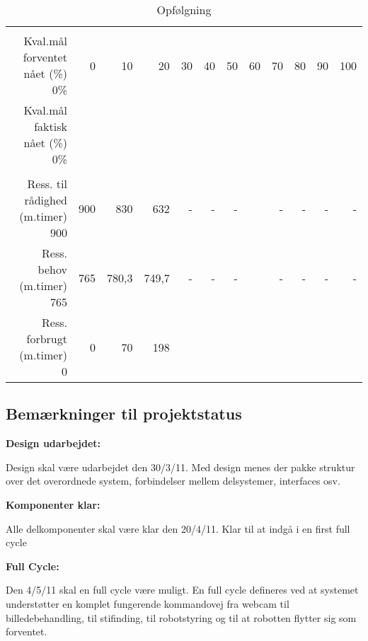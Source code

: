 \begin{sidewaystable}[!htbp]
\begin{scriptsize}
\begin{tabular}{r|rrrrrrr|rrrr}
          &       &       &       &       &       &       &       &       &       &       &  \\
    Kval.mål forventet nået (\%) 0\% & 0     & 10    & 20    & 30    & 40    & 50    & 60    & 70    & 80    & 90    & 100 \\
    Kval.mål faktisk nået (\%) 0\% &       &       &       &       &       &       &       &       &       &       &  \\
          &       &       &       &       &       &       &       &       &       &       &  \\
    Ress. til rådighed (m.timer) 900 & 900   & 830   & 632   & -     & -     & -     &       & -     & -     & -     & - \\
    Ress. behov (m.timer) 765 & 765   & 780,3 & 749,7 & -     & -     & -     &       & -     & -     & -     & - \\
    Ress. forbrugt (m.timer) 0 & 0     & 70    & 198   &       &       &       &       &       &       &       &  \\
    \end{tabular}%
\end{scriptsize}
\caption{Opfølgning}
\end{sidewaystable}


\subsection{Bemærkninger til projektstatus}
\textbf{Design udarbejdet:}

Design skal være udarbejdet den 30/3/11. 
Med design menes der pakke struktur over det overordnede system, forbindelser mellem delsystemer, interfaces osv.

\textbf{Komponenter klar:}

Alle delkomponenter skal være klar den 20/4/11. Klar til at indgå i en first full cycle	

\textbf{Full Cycle:}

Den 4/5/11 skal en full cycle være muligt.
En full cycle defineres ved at systemet understøtter en komplet fungerende kommandovej fra webcam til billedebehandling, til stifinding, til robotstyring og til at robotten flytter sig som forventet.